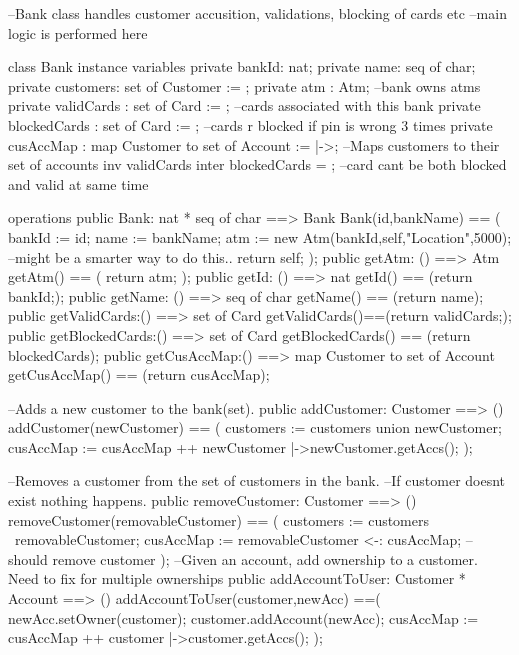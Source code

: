 \documentclass[a4paper]{article}
\begin{document}
\title{}
\author{}
\begin{vdm_al}
--Bank class handles customer accusition, validations, blocking of cards etc
--main logic is performed here

class Bank
instance variables
    private bankId: nat;
    private name: seq of char;
    private customers: set of Customer := {};
    private atm : Atm; --bank owns atms
    private validCards : set of Card := {}; --cards associated with this bank
    private blockedCards : set of Card := {}; --cards r blocked if pin is wrong 3 times
    private cusAccMap : map Customer to set of Account := {|->};
    --Maps customers to their set of accounts
    inv validCards inter blockedCards = {}; --card cant be both blocked and valid at same time

operations
    public Bank: nat * seq of char ==> Bank
    Bank(id,bankName) == (
        bankId := id;
        name := bankName;
        atm := new Atm(bankId,self,"Location",5000); --might be a smarter way to do this..
        return self;
    ); 
    public getAtm: () ==> Atm
    getAtm() == (
        return atm;
    );
    public getId: () ==> nat
    getId() == (return bankId;);
    public getName: () ==> seq of char 
    getName() == (return name);
    public getValidCards:() ==> set of Card
    getValidCards()==(return validCards;);
    public getBlockedCards:() ==> set of Card
    getBlockedCards() == (return blockedCards);
    public getCusAccMap:() ==> map Customer to set of Account
    getCusAccMap() == (return cusAccMap);

    --Adds a new customer to the bank(set).
    public addCustomer: Customer ==> ()
    addCustomer(newCustomer) == (
        customers := customers union {newCustomer};
        cusAccMap := cusAccMap ++ {newCustomer |->newCustomer.getAccs()};
    ); 

    --Removes a customer from the set of customers in the bank. 
    --If customer doesnt exist nothing happens. 
    public removeCustomer: Customer ==> ()
    removeCustomer(removableCustomer) == (
        customers := customers \ {removableCustomer};
        cusAccMap := {removableCustomer} <-: cusAccMap; --should remove customer
    );
    --Given an account, add ownership to a customer. Need to fix for multiple ownerships
    public addAccountToUser: Customer * Account ==> () 
    addAccountToUser(customer,newAcc) ==(
        newAcc.setOwner(customer);
        customer.addAccount(newAcc);
        cusAccMap := cusAccMap ++ {customer |->customer.getAccs()};
    );


\end{vdm_al}
\end{document}
